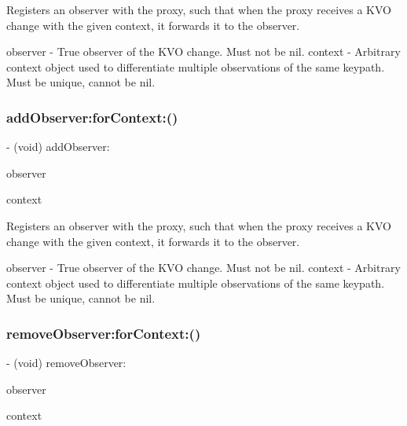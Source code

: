 Registers an observer with the proxy, such that when the proxy receives a K\+VO change with the given context, it forwards it to the observer.

observer -\/ True observer of the K\+VO change. Must not be nil. context -\/ Arbitrary context object used to differentiate multiple observations of the same keypath. Must be unique, cannot be nil. \mbox{\label{interface_r_a_c_k_v_o_proxy_a0ec4ef4f07c0068901c7d606de89a1fd}} 
\subsubsection{\texorpdfstring{add\+Observer\+:for\+Context\+:()}{addObserver:forContext:()}\hspace{0.1cm}{\footnotesize\ttfamily [3/3]}}
{\footnotesize\ttfamily -\/ (void) add\+Observer\+: \begin{DoxyParamCaption}\item[{(\+\_\+\+\_\+weak N\+S\+Object $\ast$)}]{observer }\item[{forContext:(void $\ast$)}]{context }\end{DoxyParamCaption}}

Registers an observer with the proxy, such that when the proxy receives a K\+VO change with the given context, it forwards it to the observer.

observer -\/ True observer of the K\+VO change. Must not be nil. context -\/ Arbitrary context object used to differentiate multiple observations of the same keypath. Must be unique, cannot be nil. \mbox{\label{interface_r_a_c_k_v_o_proxy_a1b7a8cc1af60353400c05976d9078d73}} 
\subsubsection{\texorpdfstring{remove\+Observer\+:for\+Context\+:()}{removeObserver:forContext:()}\hspace{0.1cm}{\footnotesize\ttfamily [1/3]}}
{\footnotesize\ttfamily -\/ (void) remove\+Observer\+: \begin{DoxyParamCaption}\item[{(N\+S\+Object $\ast$)}]{observer }\item[{forContext:(void $\ast$)}]{context }\end{DoxyParamCaption}}

